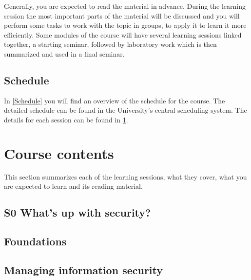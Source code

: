 Generally, you are expected to read the material in advance.
During the learning session the most important parts of the material will be 
discussed and you will perform some tasks to work with the topic in groups, 
\ie to apply it to learn it more efficiently.
Some modules of the course will have several learning sessions linked together,
\eg a starting seminar, followed by laboratory work which is then summarized 
and used in a final seminar.

\subsection{Schedule}

In \cref{Schedule} you will find an overview of the schedule for the course.
The detailed schedule can be found in the University's central scheduling 
system.
The details for each session can be found in \cref{CourseContents}.

\begin{frame}[allowframebreaks]

\end{frame}


\section{Course contents}%
\label{CourseContents}

This section summarizes each of the learning sessions, \ie what they cover, 
what you are expected to learn and its reading material.

%
%
\subsection{S0 What's up with security?}%
\label{security-society-seminar}


\subsection{Foundations}%
\label{foundations}


\subsection{Managing information security}%
\label{msb-framework}


